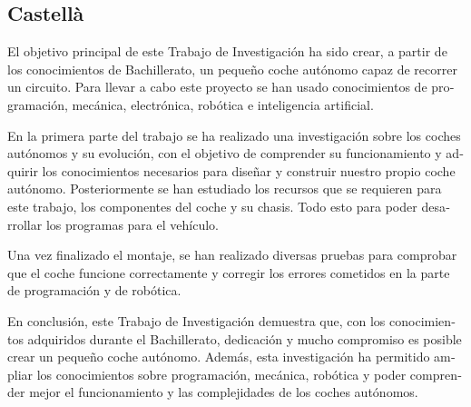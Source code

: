 \documentclass[11pt,a4paper]{article}
\begin{document}
\subsection*{Castellà}
\begin{otherlanguage}{spanish}

El objetivo principal de este Trabajo de Investigación ha sido crear, a partir de los conocimientos de Bachillerato, un pequeño coche autónomo capaz de recorrer un circuito. Para llevar a cabo este proyecto se han usado conocimientos de programación, mecánica, electrónica, robótica e inteligencia artificial.

En la primera parte del trabajo se ha realizado una investigación sobre los coches autónomos y su evolución, con el objetivo de comprender su funcionamiento y adquirir los conocimientos necesarios para diseñar y construir nuestro propio coche autónomo. Posteriormente se han estudiado los recursos que se requieren para este trabajo, los componentes del coche y su chasis. Todo esto para poder desarrollar los programas para el vehículo.

Una vez finalizado el montaje, se han realizado diversas pruebas para comprobar que el coche funcione correctamente y corregir los errores cometidos en la parte de programación y de robótica.

En conclusión, este Trabajo de Investigación demuestra que, con los conocimientos adquiridos durante el Bachillerato, dedicación y mucho compromiso es posible crear un pequeño coche autónomo. Además, esta investigación ha permitido ampliar los conocimientos sobre programación, mecánica, robótica y poder comprender mejor el funcionamiento y las complejidades de los coches autónomos.

\end{otherlanguage}

\clearpage
\end{document}
